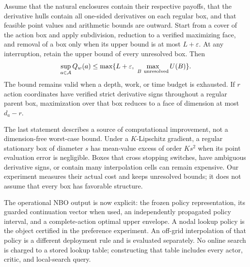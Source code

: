 \begin{theorem}\label{thm:r9cover}
Assume that the natural enclosures contain their respective payoffs, that the derivative hulls contain all one-sided derivatives on each regular box, and that feasible point values and arithmetic bounds are outward. Start from a cover of the action box and apply subdivision, reduction to a verified maximizing face, and removal of a box only when its upper bound is at most $L+\varepsilon$. At any interruption, retain the upper bound of every unresolved box. Then
\begin{equation}\label{eq:r9coverbound}
 \sup_{a\in\Act}Q_w(a)\leq\max\{L+\varepsilon,\ \max_{B\ \mathrm{unresolved}}U(B)\}.
\end{equation}
The bound remains valid when a depth, work, or time budget is exhausted. If $r$ action coordinates have verified strict derivative signs throughout a regular parent box, maximization over that box reduces to a face of dimension at most $d_a-r$.
\end{theorem}

The last statement describes a source of computational improvement, not a dimension-free worst-case bound. Under a $K$-Lipschitz gradient, a regular stationary box of diameter $s$ has mean-value excess of order $Ks^2$ when its point evaluation error is negligible. Boxes that cross stopping switches, have ambiguous derivative signs, or contain many interpolation cells can remain expensive. Our experiment measures their actual cost and keeps unresolved bounds; it does not assume that every box has favorable structure.

The operational NBO output is now explicit: the frozen policy representation, its guarded continuation vector when used, an independently propagated policy interval, and a complete-action optimal upper envelope. A nodal lookup policy is the object certified in the preference experiment. An off-grid interpolation of that policy is a different deployment rule and is evaluated separately. No online search is charged to a stored lookup table; constructing that table includes every actor, critic, and local-search query.
